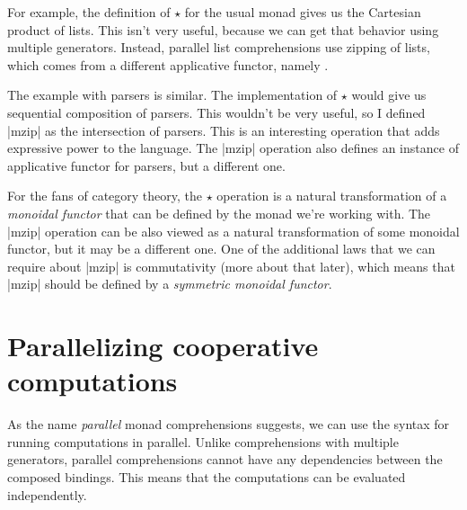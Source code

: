 \documentclass{tmr}
\newcommand{\authornote}[3]{}
\newcommand\bay[1]{\authornote{brent}{blue}{#1}}
\newcommand\tp[1]{\authornote{tomas}{red}{#1}}
\begin{document}
\bay{This is not at all obvious without
  explicitly showing the definition of $\star$ in terms of bind and
  return.}
\tp{It should be easier now - with the Monoidal class and also definition of mzip using return/bind earlier.}

\UndefineShortVerb{\_}
\DefineShortVerb{\|}

For example, the definition of $\star$ for the usual 
monad gives us the Cartesian product of lists. This isn't very useful, because we can get that
behavior using multiple generators. Instead, parallel list comprehensions use zipping of lists, which comes 
from a different applicative functor, namely .

The example with parsers is similar. The implementation of $\star$ would give us sequential 
composition of parsers. This wouldn't be very useful, so I defined |mzip| as the intersection of 
parsers. This is an interesting operation that adds expressive power to the language. The |mzip| 
operation also defines an instance of applicative functor for parsers, but a different one.

For the fans of category theory, the $\star$ operation is a natural transformation of a 
\textit{monoidal functor} that can be defined by the monad we're working with. The |mzip| operation 
can be also viewed as a natural transformation of some monoidal functor, but it may 
be a different one. One of the additional laws that we can require about |mzip| is commutativity 
(more about that later), which means that |mzip| should be defined by a 
\textit{symmetric monoidal functor}.

\bay{Saying that the
  $\star$ operation itself is a monoidal functor doesn't type check.
  Perhaps you mean to say that $\star$ corresponds to the monoidal
  functor structure on the monad we're working with, or something to
  that effect? Same thing goes for the next few sentences.}  
\tp{Clarified.}


\section{Parallelizing cooperative computations}

As the name \textit{parallel} monad comprehensions suggests, we can use the syntax for 
running computations in parallel. Unlike comprehensions with multiple generators, parallel
comprehensions cannot have any dependencies between the composed bindings. This means that the 
computations can be evaluated independently. 
\end{document}
